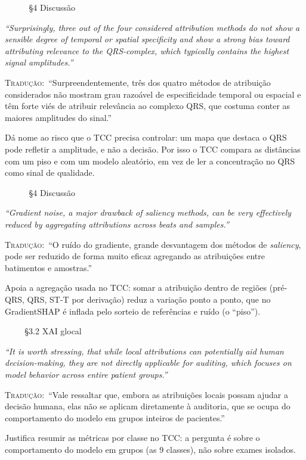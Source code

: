 \documentclass[11pt,a4paper]{article}
\newcommand{\pagechip}[1]{{\setlength{\fboxsep}{1.5pt}\colorbox{cAcc}{\textcolor{white}{\scriptsize\texttt{#1}}}}}
\newenvironment{origquote}{\par\itshape\small}{\par}
\newenvironment{tradquote}{\par\small\textsc{Tradução:}\ }{\par}
\newcommand{\explab}[1]{\par\smallskip{\small\color{cAcc}\textbf{\MakeUppercase{#1}}}\par}
\begin{document}
\begin{citacard}{\pagechip{p. 14} §4 Discussão}
\begin{origquote}“Surprisingly, three out of the four considered attribution methods do not show a sensible degree of temporal or spatial specificity and show a strong bias toward attributing relevance to the QRS-complex, which typically contains the highest signal amplitudes.”\end{origquote}
\begin{tradquote}“Surpreendentemente, três dos quatro métodos de atribuição considerados não mostram grau razoável de especificidade temporal ou espacial e têm forte viés de atribuir relevância ao complexo QRS, que costuma conter as maiores amplitudes do sinal.”\end{tradquote}
\explab{Explicação}
Dá nome ao risco que o TCC precisa controlar: um mapa que destaca o QRS pode refletir a amplitude, e não a decisão. Por isso o TCC compara as distâncias com um piso e com um modelo aleatório, em vez de ler a concentração no QRS como sinal de qualidade.
\end{citacard}

\begin{citacard}{\pagechip{p. 14} §4 Discussão}
\begin{origquote}“Gradient noise, a major drawback of saliency methods, can be very effectively reduced by aggregating attributions across beats and samples.”\end{origquote}
\begin{tradquote}“O ruído do gradiente, grande desvantagem dos métodos de \textit{saliency}, pode ser reduzido de forma muito eficaz agregando as atribuições entre batimentos e amostras.”\end{tradquote}
\explab{Explicação}
Apoia a agregação usada no TCC: somar a atribuição dentro de regiões (pré-QRS, QRS, ST-T por derivação) reduz a variação ponto a ponto, que no GradientSHAP é inflada pelo sorteio de referências e ruído (o “piso”).
\end{citacard}

\begin{citacard}{\pagechip{p. 8} §3.2 XAI glocal}
\begin{origquote}“It is worth stressing, that while local attributions can potentially aid human decision-making, they are not directly applicable for auditing, which focuses on model behavior across entire patient groups.”\end{origquote}
\begin{tradquote}“Vale ressaltar que, embora as atribuições locais possam ajudar a decisão humana, elas não se aplicam diretamente à auditoria, que se ocupa do comportamento do modelo em grupos inteiros de pacientes.”\end{tradquote}
\explab{Explicação}
Justifica resumir as métricas por classe no TCC: a pergunta é sobre o comportamento do modelo em grupos (as 9 classes), não sobre exames isolados.
\end{citacard}
\end{document}
